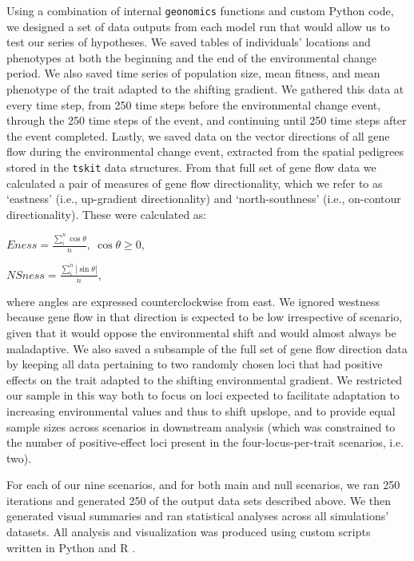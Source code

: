 \documentclass[9pt,twocolumn,twoside,lineno]{pnas-new}
\begin{document}
{Using a combination of internal \texttt{geonomics} functions and custom Python code, we 
designed a set of data outputs from each model run that would allow us to test our 
series of hypotheses. We saved tables of individuals’ locations and phenotypes at both
the beginning and the end of the environmental change period. We also saved time 
series of population size, mean fitness, and mean phenotype of the trait adapted to 
the shifting gradient. We gathered this data at every time step, from 250 time steps 
before the environmental change event, through the 250 time steps of the event, and 
continuing until 250 time steps after the event completed. 
Lastly, we saved data on the vector directions of all gene flow during the 
environmental change event, extracted from the spatial pedigrees stored in the
\texttt{tskit} \cite{kelleher} 
data structures. From that full set of gene flow data we calculated a pair of measures
of gene flow directionality,  which we refer to as ‘eastness’ (i.e., up-gradient 
directionality) and ‘north-southness’ (i.e., on-contour directionality). These were 
calculated as:

$Eness = \frac{\sum\limits_{i}^{n}\cos\theta}{n},\ \cos\theta\geq0$,

$NSness = \frac{\sum\limits_{i}^{n}|\sin\theta|}{n}$,

where angles are expressed counterclockwise from east. We ignored westness because 
gene flow in that direction is expected to be low irrespective 
of scenario, given that it would oppose the environmental shift and would almost 
always be maladaptive. We also saved a subsample of the full set of gene flow 
direction data by keeping all data pertaining to two randomly chosen loci that had 
positive effects on the trait adapted to the shifting environmental gradient. We 
restricted our sample in this way both to focus on loci expected to facilitate 
adaptation to increasing environmental values and thus to shift upslope, and to 
provide equal sample sizes across scenarios in downstream analysis (which was 
constrained to the number of positive-effect loci present in the four-locus-per-trait 
scenarios, i.e. two). 


For each of our nine scenarios, and for both main and null scenarios, we ran 250 
iterations and generated 250 of the output data sets described above. We then 
generated visual summaries and ran statistical analyses across all simulations’ 
datasets. All analysis and visualization was produced using custom scripts written in 
Python and R \cite{r_core_team}.

}
\end{document}
